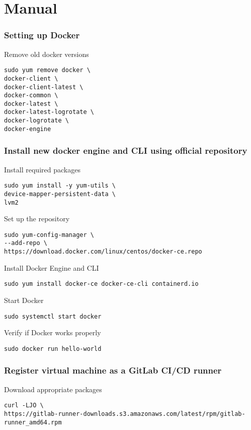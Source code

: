 \section*{Manual}

\subsubsection*{Setting up Docker}

Remove old docker versions

\begin{lstlisting}
sudo yum remove docker \
docker-client \
docker-client-latest \
docker-common \
docker-latest \
docker-latest-logrotate \
docker-logrotate \
docker-engine
\end{lstlisting}

\subsubsection*{Install new docker engine and CLI using official repository}

Install required packages
\begin{lstlisting}
sudo yum install -y yum-utils \
device-mapper-persistent-data \
lvm2
\end{lstlisting}

Set up the repository
\begin{lstlisting}
sudo yum-config-manager \
--add-repo \
https://download.docker.com/linux/centos/docker-ce.repo
\end{lstlisting}

Install Docker Engine and CLI
\begin{lstlisting}
sudo yum install docker-ce docker-ce-cli containerd.io
\end{lstlisting}

Start Docker
\begin{lstlisting}
sudo systemctl start docker
\end{lstlisting}

Verify if Docker works properly
\begin{lstlisting}
sudo docker run hello-world
\end{lstlisting}

\subsubsection*{Register virtual machine as a GitLab CI/CD runner}

Download appropriate packages
\begin{lstlisting}
curl -LJO \
https://gitlab-runner-downloads.s3.amazonaws.com/latest/rpm/gitlab-runner_amd64.rpm
\end{lstlisting}

